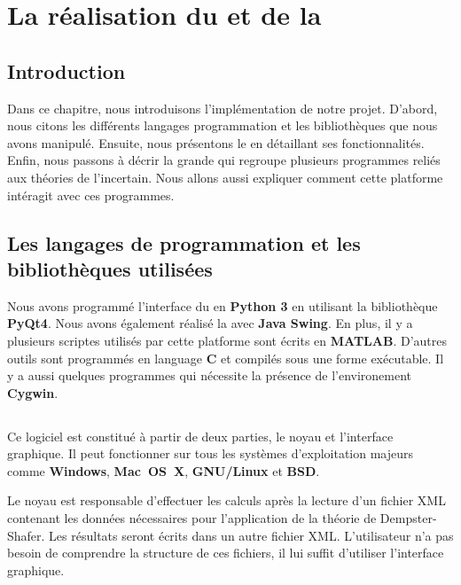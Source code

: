 \chapter{La réalisation du \appname et de la \platformename}
{}
\section*{Introduction}

Dans ce chapitre, nous introduisons l'implémentation de notre projet. D'abord, nous
citons les différents langages programmation et les bibliothèques que nous avons manipulé.
Ensuite, nous présentons le \appname en détaillant ses fonctionnalités. Enfin, nous passons
à décrir la grande \platformename qui regroupe plusieurs programmes reliés aux théories de
l'incertain. Nous allons aussi expliquer comment cette platforme intéragit avec ces programmes.

\section{Les langages de programmation et les bibliothèques utilisées}

Nous avons programmé l'interface du \appname en \textbf{Python 3}
en utilisant la bibliothèque \textbf{PyQt4}. Nous avons également réalisé la \platformename
avec \textbf{Java Swing}. En plus, il y a plusieurs scriptes utilisés par cette
platforme sont écrits en \textbf{MATLAB}. D'autres outils sont programmés en language
\textbf{C} et compilés sous une forme exécutable. Il y a aussi quelques programmes
qui nécessite la présence de l'environement \textbf{Cygwin}.

\section{\appName}

Ce logiciel est constitué à partir de deux parties, le noyau et l'interface graphique.
Il peut fonctionner sur tous les systèmes d'exploitation majeurs comme \textbf{Windows},
\textbf{\mbox{Mac OS X}}, \textbf{\mbox{GNU/Linux}} et \textbf{BSD}.

Le noyau est responsable d'effectuer les calculs après la lecture d'un fichier XML
contenant les données nécessaires pour l'application de la théorie de Dempster-Shafer.
Les résultats seront écrits dans un autre fichier XML. L'utilisateur n'a pas besoin
de comprendre la structure de ces fichiers, il lui suffit d'utiliser l'interface
graphique.

